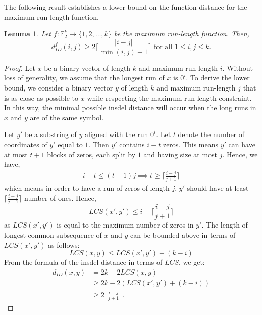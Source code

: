 \documentclass[11 pt]{article}
\numberwithin{equation}{section}
\newtheorem{lemma}[theorem]{Lemma}
\begin{document}
    The following result establishes a lower bound on the function distance for the maximum run-length function.
    \begin{lemma}
    \label{function_dis_lower}
        Let $f: \mathbb{F}_2^k \rightarrow \{1, 2, \ldots,k\}$ be the maximum run-length function. Then,
        \[
            d_{ID}^f(i,j) \geq 2\Big \lceil \frac{|i-j|}{\min(i,j)+1} \Big \rceil \text{ for all } 1 \leq i,j \leq k.
        \]
    \end{lemma}
    \begin{proof}
        Let $x$ be a binary vector of length $k$ and maximum run-length $i$. Without loss of generality, we assume that the longest run of $x$ is $0^i$. To derive the lower bound, we consider a binary vector $y$ of length $k$ and maximum run-length $j$ that is as close as possible to $x$ while respecting the maximum run-length constraint. In this way, the minimal possible insdel distance will occur when the long runs in $x$ and $y$ are of the same symbol. 
        
        Let $y'$ be a substring of $y$ aligned with the run $0^i$. Let \(t\) denote the number of coordinates of \(y'\) equal to \(1\).
    Then \(y'\) contains \(i-t\) zeros. This means $y'$ can have at most $t+1$ blocks of zeros, each split by $1$ and having size at most $j$. Hence, we have,
        \begin{align*}
            i - t \leq (t+1)j \implies t \geq \Big \lceil \frac{i-j}{j+1} \Big \rceil
        \end{align*}
        which means in order to have a run of zeros of length $j$, $y'$ should have at least $\Big \lceil \frac{i-j}{j+1} \Big \rceil$ number of ones.
        Hence, 
        \[
            LCS(x', y') \leq i -\Big \lceil \frac{i-j}{j+1} \Big \rceil
        \]
        as $LCS(x',y')$ is equal to the maximum number of zeros in $y'$. The length of longest common subsequence of $x$ and $y$ can be bounded above in terms of $LCS(x',y')$ as follows:
        \[
            LCS(x,y) \leq LCS(x',y') + (k-i)
        \]
        From the formula of the insdel distance in terms of $LCS$, we get:
        \begin{align*}
            d_{ID}(x,y) &= 2k - 2LCS(x,y)\\
                            &\geq 2k - 2(LCS(x',y') + (k-i)) \\
                            &\geq 2\Big \lceil \frac{i-j}{j+1} \Big \rceil.
        \end{align*}
    \end{proof}
\end{document}
